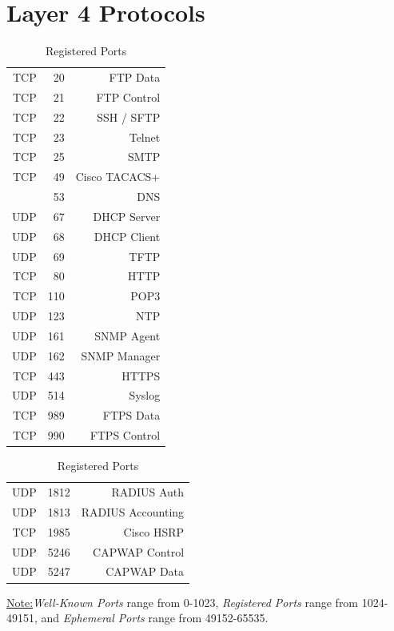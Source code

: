 \documentclass[12pt]{article}
\newif\ifcolor											%
\newcommand{\note}[1]{\ifcolor \colorbox{#1}{Note:}\else \underline{Note:}\fi}
\begin{document}
\section{Layer 4 Protocols \label{sec:L4}}
	\begin{table}[H]
	\begin{minipage}[t]{.45\linewidth}
	\centering
	\caption{Well-Known Ports \label{tab:L4 PORTS KNOWN}}
	\begin{tabular}{| r r | r |}\hline
	TCP	& 20		& FTP Data\\
	TCP	& 21		& FTP Control\\\hline
	TCP	& 22		& SSH / SFTP\\\hline
	TCP	& 23		& Telnet\\\hline
	TCP	& 25		& SMTP\\\hline
	TCP	& 49		& Cisco TACACS+\\\hline
	       	& 53		& DNS\\\hline
	UDP	& 67		& DHCP Server\\
	UDP	& 68		& DHCP Client\\\hline
	UDP	& 69		& TFTP\\\hline
	TCP	& 80		& HTTP\\\hline
	TCP	& 110		& POP3\\\hline
	UDP	& 123		& NTP\\\hline
	UDP	& 161		& SNMP Agent\\
	UDP	& 162		& SNMP Manager\\\hline
	TCP	& 443		& HTTPS\\\hline
	UDP	& 514		& Syslog\\\hline
	TCP	& 989		& FTPS Data\\
	TCP	& 990		& FTPS Control\\\hline
	\end{tabular}\end{minipage}\hfill
	\begin{minipage}[t]{.45\linewidth}
	\centering
	\caption{Registered Ports \label{tab:L4 PORTS REGISTERED}}
	\begin{tabular}{| c r | r |}\hline
	UDP	& 1812	& RADIUS Auth\\
	UDP	& 1813	& RADIUS Accounting\\\hline
	TCP	& 1985	& Cisco HSRP\\\hline
	UDP	& 5246	& CAPWAP Control\\
	UDP	& 5247	& CAPWAP Data\\\hline
	\end{tabular}\end{minipage}\end{table}
	\note{Goldenrod}\textit{Well-Known Ports} range from 0-1023, \textit{Registered Ports} range from 1024-49151, and \textit{Ephemeral Ports} range from 49152-65535.
\end{document}
